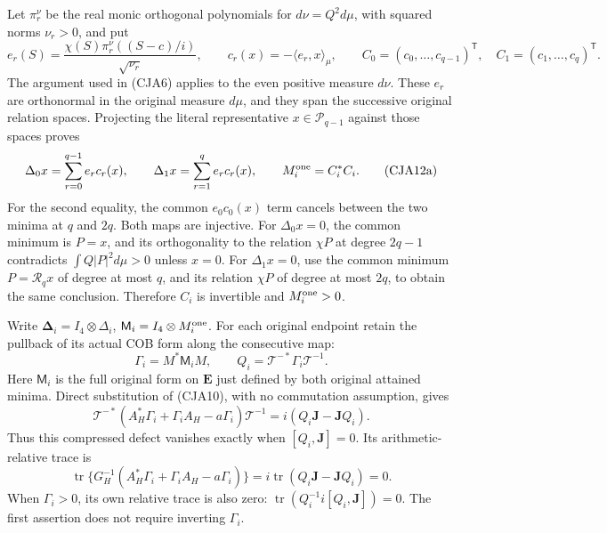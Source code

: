 Let \(\pi_r^\nu\) be the real monic orthogonal polynomials for
\(d\nu=Q^2d\mu\), with squared norms \(\nu_r>0\), and put
\[
 e_r(S)=\frac{\chi(S)\pi_r^\nu((S-c)/i)}{\sqrt{\nu_r}},
 \qquad c_r(x)=-\langle e_r,x\rangle_\mu,\qquad
 C_0=(c_0,\ldots,c_{q-1})^{\mathsf T},\quad
 C_1=(c_1,\ldots,c_q)^{\mathsf T}.
 \]
The argument used in (CJA6) applies to the even positive measure
\(d\nu\).  These \(e_r\) are orthonormal in the original measure
\(d\mu\), and they span the successive original relation spaces.
Projecting the literal representative \(x\in\mathcal P_{q-1}\)
against those spaces proves
\begin{equation}
 \Delta_0x=\sum_{r=0}^{q-1}e_rc_r(x),\qquad
 \Delta_1x=\sum_{r=1}^{q}e_rc_r(x),\qquad
 M_i^{\rm one}=C_i^*C_i .
 \tag{CJA12a}
\end{equation}
For the second equality, the common \(e_0c_0(x)\) term cancels
between the two minima at \(q\) and \(2q\).
Both maps are injective.
For \(\Delta_0x=0\), the common minimum is \(P=x\), and its
orthogonality to the relation \(\chi P\) at degree \(2q-1\)
contradicts \(\int Q|P|^2d\mu>0\) unless \(x=0\).
For \(\Delta_1x=0\), use the common minimum
\(P=\mathscr R_qx\) of degree at most \(q\), and its relation
\(\chi P\) of degree at most \(2q\), to obtain the same conclusion.
Therefore \(C_i\) is invertible and \(M_i^{\rm one}>0\).

Write \(\boldsymbol\Delta_i=I_4\otimes\Delta_i\),
\(\mathsf M_i=I_4\otimes M_i^{\rm one}\).
For each original endpoint retain the pullback of its actual COB form
along the consecutive map:
\[
 \Gamma_i=M^*\mathsf M_iM,\qquad
 Q_i=\mathcal T^{-*}\Gamma_i\mathcal T^{-1}.
\]
Here \(\mathsf M_i\) is the full original form on \(\mathbf E\)
just defined by both original attained minima.
Direct substitution of (CJA10), with no commutation assumption, gives
\begin{equation}
 \boxed{\mathcal T^{-*}
 (A_H^*\Gamma_i+\Gamma_iA_H-a\Gamma_i)\mathcal T^{-1}
       =i(Q_i\mathbf J-\mathbf JQ_i).}
 \tag{CJA13}
\end{equation}
Thus this compressed defect vanishes exactly when
\([Q_i,\mathbf J]=0\).
Its arithmetic-relative trace is
\[
 \operatorname{tr}\{G_H^{-1}
 (A_H^*\Gamma_i+\Gamma_iA_H-a\Gamma_i)\}
   =i\operatorname{tr}(Q_i\mathbf J-\mathbf JQ_i)=0 .
\]
When \(\Gamma_i>0\), its own relative trace is also zero:
\(\operatorname{tr}(Q_i^{-1}i[Q_i,\mathbf J])=0\).
The first assertion does not require inverting \(\Gamma_i\).

